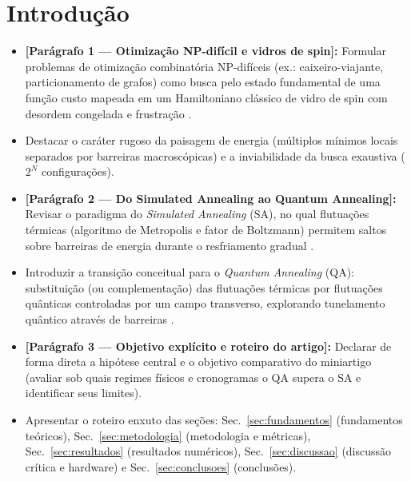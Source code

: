 \documentclass[aps,pre,twocolumn,10pt,superscriptaddress,nofootinbib]{revtex4-2}
\begin{document}
\section{Introdução}
\label{sec:intro}

\begin{itemize}
  \item \textbf{[Parágrafo 1 --- Otimização NP-difícil e vidros de spin]:}
        Formular problemas de otimização combinatória NP-difíceis (ex.: caixeiro-viajante, particionamento de grafos) como busca pelo estado fundamental de uma função custo mapeada em um Hamiltoniano clássico de vidro de spin com desordem congelada e frustração \cite{Kirkpatrick1983,Das2008}.
  \item Destacar o caráter rugoso da paisagem de energia (múltiplos mínimos locais separados por barreiras macroscópicas) e a inviabilidade da busca exaustiva ($2^N$ configurações).
\end{itemize}

\begin{itemize}
  \item \textbf{[Parágrafo 2 --- Do Simulated Annealing ao Quantum Annealing]:}
        Revisar o paradigma do \emph{Simulated Annealing} (SA), no qual flutuações térmicas (algoritmo de Metropolis e fator de Boltzmann) permitem saltos sobre barreiras de energia durante o resfriamento gradual \cite{Kirkpatrick1983}.
  \item Introduzir a transição conceitual para o \emph{Quantum Annealing} (QA): substituição (ou complementação) das flutuações térmicas por flutuações quânticas controladas por um campo transverso, explorando tunelamento quântico através de barreiras \cite{Kadowaki1998,Das2008,Chakrabarti2022}.
\end{itemize}

\begin{itemize}
  \item \textbf{[Parágrafo 3 --- Objetivo explícito e roteiro do artigo]:}
        Declarar de forma direta a hipótese central e o objetivo comparativo do miniartigo (avaliar sob quais regimes físicos e cronogramas o QA supera o SA e identificar seus limites).
  \item Apresentar o roteiro enxuto das seções: Sec.~\ref{sec:fundamentos} (fundamentos teóricos), Sec.~\ref{sec:metodologia} (metodologia e métricas), Sec.~\ref{sec:resultados} (resultados numéricos), Sec.~\ref{sec:discussao} (discussão crítica e hardware) e Sec.~\ref{sec:conclusoes} (conclusões).
\end{itemize}
\end{document}
